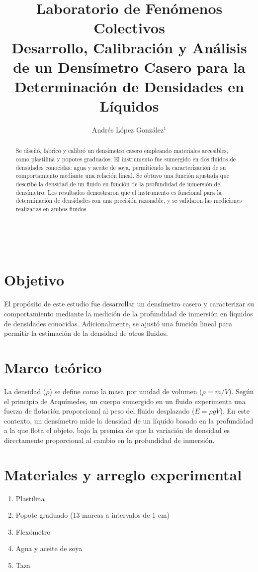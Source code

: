 \documentclass[article,12pt]{elsarticle}
\begin{document}
\begin{frontmatter}
    \title{Laboratorio de Fenómenos Colectivos \\ Desarrollo, Calibración y Análisis de un Densímetro Casero para la Determinación de Densidades en Líquidos} \\
    \author{Andrés López González$^1$} %
    \address{$^1$ Facultad de Ciencias, Universidad Nacional Autónoma de México, M\'exico CDMX.}
\end{frontmatter}

\begin{abstract}
Se diseñó, fabricó y calibró un densímetro casero empleando materiales accesibles, como plastilina y popotes graduados. El instrumento fue sumergido en dos fluidos de densidades conocidas: agua y aceite de soya, permitiendo la caracterización de su comportamiento mediante una relación lineal. Se obtuvo una función ajustada que describe la densidad de un fluido en función de la profundidad de inmersión del densímetro. Los resultados demostraron que el instrumento es funcional para la determinación de densidades con una precisión razonable, y se validaron las mediciones realizadas en ambos fluidos.
\end{abstract}

\section{Objetivo}
El propósito de este estudio fue desarrollar un densímetro casero y caracterizar su comportamiento mediante la medición de la profundidad de inmersión en líquidos de densidades conocidas. Adicionalmente, se ajustó una función lineal para permitir la estimación de la densidad de otros fluidos.  

\section{Marco teórico}
La densidad (\(\rho\)) se define como la masa por unidad de volumen (\(\rho = m/V\)). Según el principio de Arquímedes, un cuerpo sumergido en un fluido experimenta una fuerza de flotación proporcional al peso del fluido desplazado (\(E = \rho g V\)). En este contexto, un densímetro mide la densidad de un líquido basado en la profundidad a la que flota el objeto, bajo la premisa de que la variación de densidad es directamente proporcional al cambio en la profundidad de inmersión.

\section{Materiales y arreglo experimental}
\begin{enumerate}
    \item  Plastilina  
\item Popote graduado (13 marcas a intervalos de 1 cm)  
\item Flexómetro  
\item Agua y aceite de soya  
\item Taza  
\end{enumerate}
\end{document}
